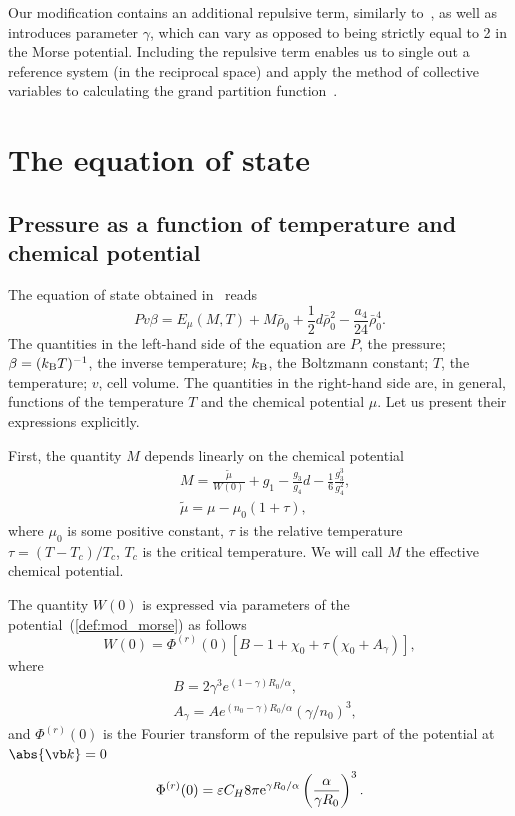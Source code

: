 \documentclass[fleqn,twoside,twocolumn,nofootinbib,showkeys]{revtex4} %
\begin{document}
	Our modification contains an additional repulsive term, similarly to~\cite{MartinezValenciaEtAl2013}, as well as introduces parameter $\gamma$, which can vary as opposed to being strictly equal to 2 in the Morse potential. Including the repulsive term enables us to single out a reference system (in the reciprocal space) and apply the method of collective variables to calculating the grand partition function~\cite{KozlovskiiDobush2016}.
	
	\section{\label{sec:eos}The equation of state}
	\subsection{Pressure as a function of temperature and chemical potential}
	The equation of state obtained in~\cite{KozlovskiiDobush2020} reads
	\begin{equation}
		\label{eq:eosMT}
		Pv\beta = E_\mu(M, T) + M \bar \rho_0 + \frac{1}{2} d \bar \rho_0^2 - \frac{a_4}{24} \bar \rho_0^4.
	\end{equation}
	The quantities in the left-hand side of the equation are $P$, the pressure; $\beta = (k_{\rm B} T)^{-1}$, the inverse temperature; $k_{\rm B}$, the Boltzmann constant; $T$, the temperature; $v$, cell volume. The quantities in the right-hand side are, in general, functions of the temperature $T$ and the chemical potential $\mu$. Let us present their expressions explicitly.
	
	First, the quantity $M$ depends linearly on the chemical potential
	\begin{align}\label{chem_pot}
		&	M = \frac{\tilde\mu}{W(0)} + g_1 - \frac{g_3}{g_4} d - \frac{1}{6} \frac{g_3^3}{g_4^2}, \\
		&	\tilde\mu=\mu-\mu_0(1+\tau),
	\end{align}
	where $\mu_0$ is some positive constant, $\tau$ is the relative temperature $\tau = (T - T_c) / T_c$, $T_c$ is the critical temperature. We will call $M$ the effective chemical potential.
	
	The quantity $W(0)$ is expressed via parameters of the potential~(\ref{def:mod_morse}) as follows
	\begin{equation}
		W(0) = \Phi^{(r)}(0) \left[ B - 1 + \chi_0 + \tau (\chi_0 + A_\gamma) \right],
	\end{equation}
	where
	\begin{align*} 
		& B = 2 \gamma^3 e^{(1-\gamma)R_0/\alpha},
		\nonumber \\
		& A_\gamma = A e^{(n_0-\gamma)R_0/\alpha} \left( \gamma / n_0\right)^3, 
	\end{align*}
	and $\Phi^{(r)}(0)$ is the Fourier transform of the repulsive part of the potential at $\abs{\vb k}=0$
	\begin{equation*}
		\Phi^{(r)}(0) = \varepsilon C_H 8\pi {\rm e}^{\gamma R_0/\alpha} \left(\frac{\alpha}{\gamma R_0}\right)^3.
	\end{equation*}
	
\end{document}
